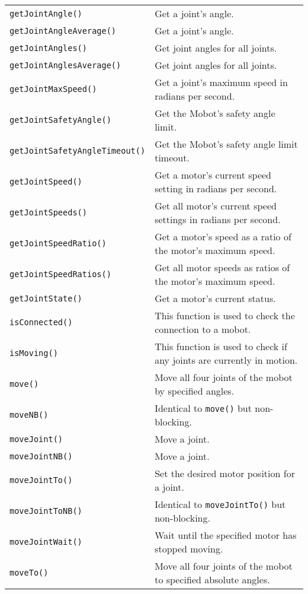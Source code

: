 \begin{table}[!h]
\begin{center}
\begin{tabular}{p{48 mm}p{110 mm}}
\texttt{getJointAngle()} & Get a joint's angle. \\
\texttt{getJointAngleAverage()} & Get a joint's angle. \\
\texttt{getJointAngles()} & Get joint angles for all joints. \\
\texttt{getJointAnglesAverage()} & Get joint angles for all joints. \\
\texttt{getJointMaxSpeed()} & Get a joint's maximum speed in radians per second. \\
\texttt{getJointSafetyAngle()} & Get the Mobot's safety angle limit. \\
\texttt{getJointSafetyAngleTimeout()} & Get the Mobot's safety angle limit timeout. \\
\texttt{getJointSpeed()} & Get a motor's current speed setting in radians per second. \\
\texttt{getJointSpeeds()} & Get all motor's current speed settings in radians per second. \\
\texttt{getJointSpeedRatio()} & Get a motor's speed as a ratio of the motor's maximum speed. \\
\texttt{getJointSpeedRatios()} & Get all motor speeds as ratios of the motor's maximum speed. \\
\texttt{getJointState()} & Get a motor's current status. \\
\texttt{isConnected()} & This function is used to check the connection to a mobot. \\
\texttt{isMoving()} & This function is used to check if any joints are currently in motion. \\
\texttt{move()} & Move all four joints of the mobot by specified angles. \\
\texttt{moveNB()} & Identical to \texttt{move()} but non-blocking. \\
\texttt{moveJoint()} & Move a joint. \\
\texttt{moveJointNB()} & Move a joint. \\
\texttt{moveJointTo()} & Set the desired motor position for a joint. \\
\texttt{moveJointToNB()} & Identical to \texttt{moveJointTo()} but non-blocking. \\
\texttt{moveJointWait()} & Wait until the specified motor has stopped moving. \\
\texttt{moveTo()} & Move all four joints of the mobot to specified absolute angles. \\

\end{tabular}
\end{center}
\end{table}
